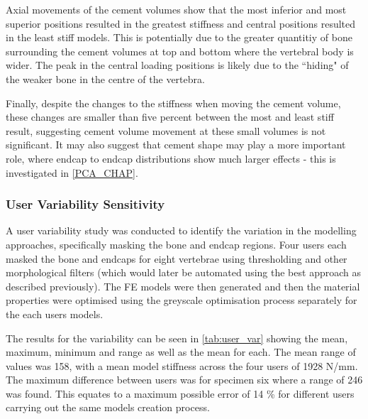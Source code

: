 Axial movements of the cement volumes show that the most inferior and most
superior positions resulted in the greatest stiffness and central positions
resulted in the least stiff models.  This is potentially due to the greater
quantitiy of bone surrounding the cement volumes at top and bottom where the
vertebral body is wider.  The peak in the central loading positions is likely
due to the ``hiding" of the weaker bone in the centre of the vertebra.

Finally, despite the changes to the stiffness when moving the cement volume,
these changes are smaller than five percent between the most and least stiff
result, suggesting cement volume movement at these small volumes is not
significant.  It may also suggest that cement shape may play a more important
role, where endcap to endcap distributions show much larger effects - this is
investigated in \cref{PCA_CHAP}.

\subsubsection{User Variability Sensitivity}
\label{sec:uvs}

A user variability study was conducted to identify the variation in the
modelling approaches, specifically masking the bone and endcap regions. Four
users each masked the bone and endcaps for eight vertebrae using thresholding
and other morphological filters (which would later be automated using the best
approach as described previously). The FE models were then generated and then
the material properties were optimised using the greyscale optimisation process
separately for the each users models.

The results for the variability can be seen in \cref{tab:user_var} showing the
mean, maximum, minimum and range as well as the mean for each. The mean range
of values was 158, with a mean model stiffness across the four users of 1928
N/mm. The maximum difference between users was for specimen six where a range
of 246 was found. This equates to a maximum possible error of 14 \% for
different users carrying out the same models creation process.

